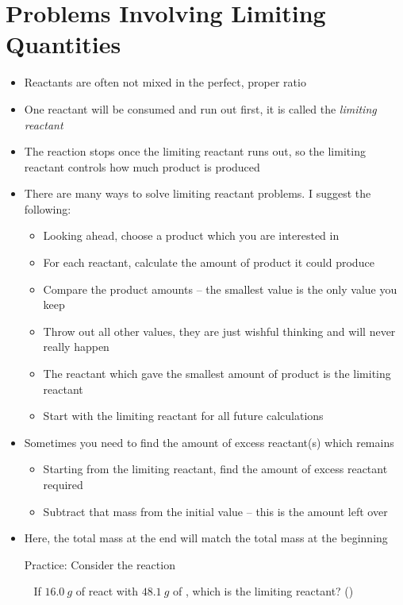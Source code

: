 \documentclass[12pt, openany, letterpaper]{memoir}
\begin{document}
\section{Problems Involving Limiting Quantities}
\begin{itemize}
	\item Reactants are often not mixed in the perfect, proper ratio
	\item One reactant will be consumed and run out first, it is called the \emph{limiting reactant}
	\item The reaction stops once the limiting reactant runs out, so the limiting reactant controls how much product is produced
	\item There are many ways to solve limiting reactant problems. I suggest the following:
	      \begin{itemize}
		      \item Looking ahead, choose a product which you are interested in
		      \item For each reactant, calculate the amount of product it could produce
		      \item Compare the product amounts -- the smallest value is the only value you keep
		      \item Throw out all other values, they are just wishful thinking and will never really happen
		      \item The reactant which gave the smallest amount of product is the limiting reactant
		      \item Start with the limiting reactant for all future calculations
	      \end{itemize}
	\item Sometimes you need to find the amount of excess reactant(s) which remains
	      \begin{itemize}
		      \item Starting from the limiting reactant, find the amount of excess reactant required
		      \item Subtract that mass from the initial value -- this is the amount left over
	      \end{itemize}
	\item Here, the total mass at the end will match the total mass at the beginning

	      Practice: Consider the reaction 

	      ~\hphantom{Practice:} If $16.0~g$ of  react with $48.1~g$ of , which is the limiting reactant? \hspace{1em} ()


\end{itemize}
\end{document}
